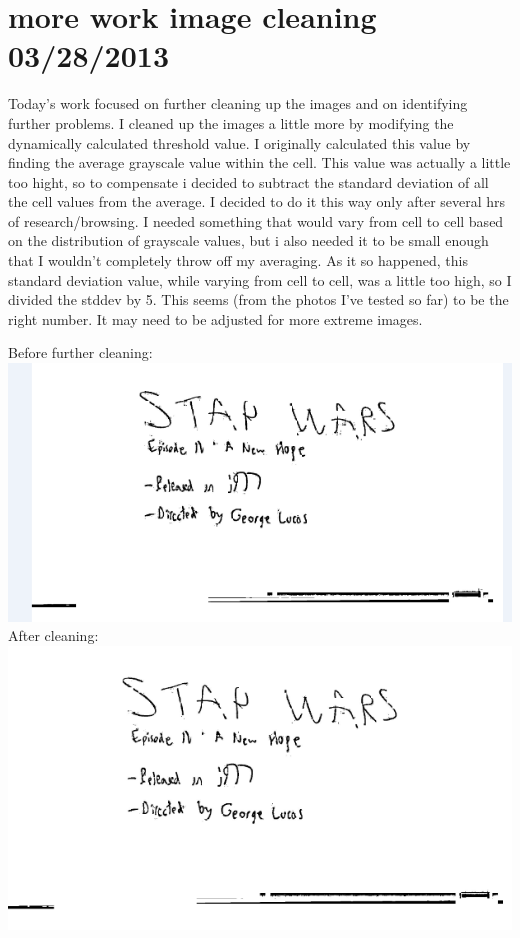 \documentclass[]{article}
\begin{document}
	\tableofcontents
	\newpage
	
	\section{more work image cleaning 03/28/2013}
	
	Today's work focused on further cleaning up the images and on identifying further problems. I cleaned up the images a little more by modifying the dynamically calculated threshold value. I originally calculated this value by finding the average grayscale value within the cell. This value was actually a little too hight, so to compensate i decided to subtract the standard deviation of all the cell values from the average. I decided to do it this way only after several hrs of research/browsing. I needed something that would vary from cell to cell based on the distribution of grayscale values, but i also needed it to be small enough that I wouldn't completely throw off my averaging. As it so happened, this standard deviation value, while varying from cell to cell, was a little too high, so I divided the stddev by 5. This seems (from the photos I've tested so far) to be the right number. It may need to be adjusted for more extreme images.
	
	Before further cleaning: \\
	\includegraphics[scale=1]{images/withoutStdDev.png} \\
	
	After cleaning: \\
	\includegraphics[scale=1]{images/withStdDev.png} \\
	
\end{document}

